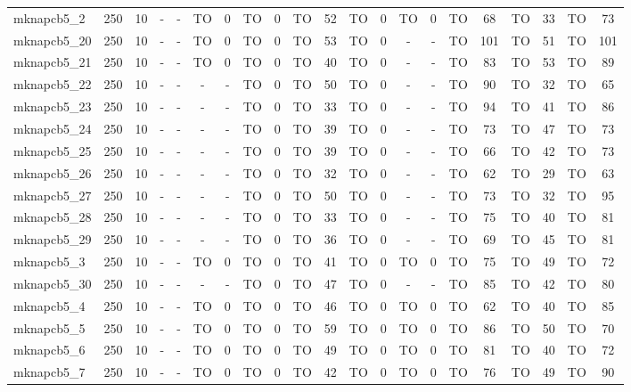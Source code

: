 \begin{sidewaystable}[!ht]
{\begin{tabular}{lcccccccccccccccccccc}
mknapcb5\_2 & 250 & 10 &  - &  - & TO & 0 & TO & 0 & TO & 52 & TO & 0 & TO & 0 & TO & 68 & TO & 33 & TO & 73 \\
mknapcb5\_20 & 250 & 10 &  - &  - & TO & 0 & TO & 0 & TO & 53 & TO & 0 &  - &  - & TO & 101 & TO & 51 & TO & 101 \\
mknapcb5\_21 & 250 & 10 &  - &  - & TO & 0 & TO & 0 & TO & 40 & TO & 0 &  - &  - & TO & 83 & TO & 53 & TO & 89 \\
mknapcb5\_22 & 250 & 10 &  - &  - &  - &  - & TO & 0 & TO & 50 & TO & 0 &  - &  - & TO & 90 & TO & 32 & TO & 65 \\
mknapcb5\_23 & 250 & 10 &  - &  - &  - &  - & TO & 0 & TO & 33 & TO & 0 &  - &  - & TO & 94 & TO & 41 & TO & 86 \\
mknapcb5\_24 & 250 & 10 &  - &  - &  - &  - & TO & 0 & TO & 39 & TO & 0 &  - &  - & TO & 73 & TO & 47 & TO & 73 \\
mknapcb5\_25 & 250 & 10 &  - &  - &  - &  - & TO & 0 & TO & 39 & TO & 0 &  - &  - & TO & 66 & TO & 42 & TO & 73 \\
mknapcb5\_26 & 250 & 10 &  - &  - &  - &  - & TO & 0 & TO & 32 & TO & 0 &  - &  - & TO & 62 & TO & 29 & TO & 63 \\
mknapcb5\_27 & 250 & 10 &  - &  - &  - &  - & TO & 0 & TO & 50 & TO & 0 &  - &  - & TO & 73 & TO & 32 & TO & 95 \\
mknapcb5\_28 & 250 & 10 &  - &  - &  - &  - & TO & 0 & TO & 33 & TO & 0 &  - &  - & TO & 75 & TO & 40 & TO & 81 \\
mknapcb5\_29 & 250 & 10 &  - &  - &  - &  - & TO & 0 & TO & 36 & TO & 0 &  - &  - & TO & 69 & TO & 45 & TO & 81 \\
mknapcb5\_3 & 250 & 10 &  - &  - & TO & 0 & TO & 0 & TO & 41 & TO & 0 & TO & 0 & TO & 75 & TO & 49 & TO & 72 \\
mknapcb5\_30 & 250 & 10 &  - &  - &  - &  - & TO & 0 & TO & 47 & TO & 0 &  - &  - & TO & 85 & TO & 42 & TO & 80 \\
mknapcb5\_4 & 250 & 10 &  - &  - & TO & 0 & TO & 0 & TO & 46 & TO & 0 & TO & 0 & TO & 62 & TO & 40 & TO & 85 \\
mknapcb5\_5 & 250 & 10 &  - &  - & TO & 0 & TO & 0 & TO & 59 & TO & 0 & TO & 0 & TO & 86 & TO & 50 & TO & 70 \\
mknapcb5\_6 & 250 & 10 &  - &  - & TO & 0 & TO & 0 & TO & 49 & TO & 0 & TO & 0 & TO & 81 & TO & 40 & TO & 72 \\
mknapcb5\_7 & 250 & 10 &  - &  - & TO & 0 & TO & 0 & TO & 42 & TO & 0 & TO & 0 & TO & 76 & TO & 49 & TO & 90 \\

\end{tabular}}
\end{sidewaystable}

